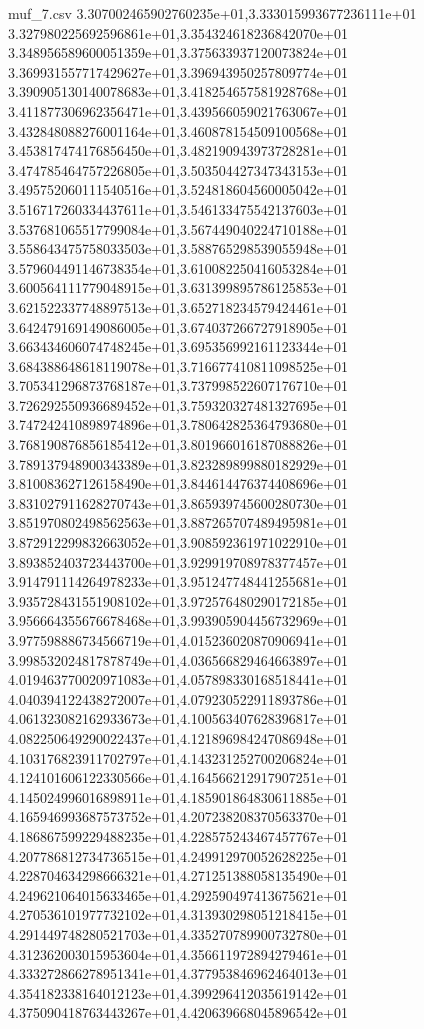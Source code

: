 \begin{filecontents*}{muf_7.csv}
3.307002465902760235e+01,3.333015993677236111e+01
3.327980225692596861e+01,3.354324618236842070e+01
3.348956589600051359e+01,3.375633937120073824e+01
3.369931557717429627e+01,3.396943950257809774e+01
3.390905130140078683e+01,3.418254657581928768e+01
3.411877306962356471e+01,3.439566059021763067e+01
3.432848088276001164e+01,3.460878154509100568e+01
3.453817474176856450e+01,3.482190943973728281e+01
3.474785464757226805e+01,3.503504427347343153e+01
3.495752060111540516e+01,3.524818604560005042e+01
3.516717260334437611e+01,3.546133475542137603e+01
3.537681065517799084e+01,3.567449040224710188e+01
3.558643475758033503e+01,3.588765298539055948e+01
3.579604491146738354e+01,3.610082250416053284e+01
3.600564111779048915e+01,3.631399895786125853e+01
3.621522337748897513e+01,3.652718234579424461e+01
3.642479169149086005e+01,3.674037266727918905e+01
3.663434606074748245e+01,3.695356992161123344e+01
3.684388648618119078e+01,3.716677410811098525e+01
3.705341296873768187e+01,3.737998522607176710e+01
3.726292550936689452e+01,3.759320327481327695e+01
3.747242410898974896e+01,3.780642825364793680e+01
3.768190876856185412e+01,3.801966016187088826e+01
3.789137948900343389e+01,3.823289899880182929e+01
3.810083627126158490e+01,3.844614476374408696e+01
3.831027911628270743e+01,3.865939745600280730e+01
3.851970802498562563e+01,3.887265707489495981e+01
3.872912299832663052e+01,3.908592361971022910e+01
3.893852403723443700e+01,3.929919708978377457e+01
3.914791114264978233e+01,3.951247748441255681e+01
3.935728431551908102e+01,3.972576480290172185e+01
3.956664355676678468e+01,3.993905904456732969e+01
3.977598886734566719e+01,4.015236020870906941e+01
3.998532024817878749e+01,4.036566829464663897e+01
4.019463770020971083e+01,4.057898330168518441e+01
4.040394122438272007e+01,4.079230522911893786e+01
4.061323082162933673e+01,4.100563407628396817e+01
4.082250649290022437e+01,4.121896984247086948e+01
4.103176823911702797e+01,4.143231252700206824e+01
4.124101606122330566e+01,4.164566212917907251e+01
4.145024996016898911e+01,4.185901864830611885e+01
4.165946993687573752e+01,4.207238208370563370e+01
4.186867599229488235e+01,4.228575243467457767e+01
4.207786812734736515e+01,4.249912970052628225e+01
4.228704634298666321e+01,4.271251388058135490e+01
4.249621064015633465e+01,4.292590497413675621e+01
4.270536101977732102e+01,4.313930298051218415e+01
4.291449748280521703e+01,4.335270789900732780e+01
4.312362003015953604e+01,4.356611972894279461e+01
4.333272866278951341e+01,4.377953846962464013e+01
4.354182338164012123e+01,4.399296412035619142e+01
4.375090418763443267e+01,4.420639668045896542e+01

\end{filecontents*}
